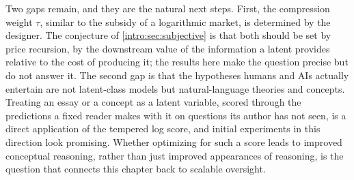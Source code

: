 \begin{draftblock}
Two gaps remain, and they are the natural next steps. First, the compression weight $\tau$, similar to the subsidy of a logarithmic market, is determined by the designer. The conjecture of \cref{intro:sec:subjective} is that both should be set by price recursion, by the downstream value of the information a latent provides relative to the cost of producing it; the results here make the question precise but do not answer it. The second gap is that the hypotheses humans and AIs actually entertain are not latent-class models but natural-language theories and concepts. Treating an essay or a concept as a latent variable, scored through the predictions a fixed reader makes with it on questions its author has not seen, is a direct application of the tempered log score, and initial experiments in this direction look promising. Whether optimizing for such a score leads to improved conceptual reasoning, rather than just improved appearances of reasoning, is the question that connects this chapter back to scalable oversight.

\end{draftblock}
